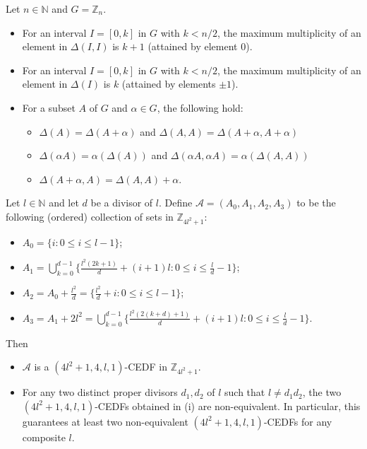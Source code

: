 \documentclass[10pt,a4paper]{amsart}
\begin{document}
\begin{lemma}\label{lem:intdiffs}
Let $n \in \mathbb{N}$ and $G=\mathbb{Z}_n$.
\begin{itemize}
\item[(i)]  For an interval $I=[0,k]$ in $G$ with $k<n/2$, the maximum multiplicity of an element in $\Delta(I,I)$ is $k+1$ (attained by element $0$).
\item[(ii)] For an interval $I=[0,k]$ in $G$ with $k<n/2$, the maximum multiplicity of an element in $\Delta(I)$ is $k$ (attained by elements $\pm 1$).
\item[(iii)] For a subset $A$ of $G$ and $\alpha \in G$, the following hold:
\begin{itemize}
 \item [1)] $\Delta(A) = \Delta(A+\alpha)$ and $\Delta(A,A) = \Delta(A+\alpha, A+ \alpha)$ 
\item [(2)] $\Delta(\alpha A) = \alpha (\Delta(A))$ and $\Delta(\alpha A, \alpha A) = \alpha (\Delta(A,A))$
\item [(3)] $\Delta(A+\alpha, A) =\Delta(A,A)+\alpha$.
\end{itemize}
\end{itemize}
\end{lemma}

\begin{theorem}\label{thm:m=4}
Let $l \in \mathbb{N}$ and let $d$ be a divisor of $l$.  Define $\mathcal{A}=(A_0,A_1,A_2,A_3)$ to be the following (ordered) collection of sets in $\mathbb{Z}_{4l^2+1}$:
\begin{itemize}
\item $A_0=\{i: 0 \leq i \leq l-1\}$;
\item $A_1=\bigcup_{k=0}^{d-1}\{\frac{l^2(2k+1)}{d}+(i+1)l: 0 \leq i \leq \frac{l}{d}-1\}$;
\item $A_2=A_0+\frac{l^2}{d}=\{\frac{l^2}{d}+i:0 \leq i \leq l-1\}$;
\item $A_3=A_1+2l^2=\bigcup_{k=0}^{d-1}\{\frac{l^2(2(k+d)+1)}{d}+(i+1)l: 0 \leq i \leq \frac{l}{d}-1\}$.
\end{itemize}
Then
\begin{itemize}
\item[(i)] $\mathcal{A}$ is a $(4l^2+1,4,l,1)$-CEDF in $\mathbb{Z}_{4l^2+1}$.
\item[(ii)] For any two distinct proper divisors $d_1, d_2$ of $l$ such that $l \neq d_1 d_2$, the two $(4l^2+1,4,l,1)$-CEDFs obtained in (i) are non-equivalent. In particular, this guarantees at least two non-equivalent $(4l^2+1,4,l,1)$-CEDFs for any composite $l$.
\end{itemize}
\end{theorem}
\end{document}
